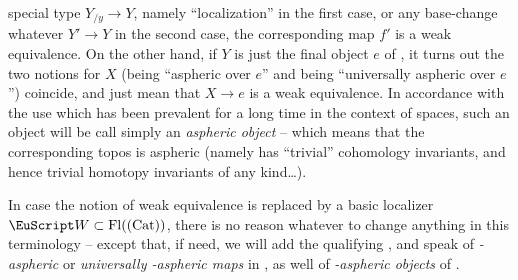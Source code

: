special type $Y_{/y}\to Y$, namely ``localization'' in the first case,
or any base-change whatever $Y'\to Y$ in the second case, the
corresponding map $f'$ is a weak equivalence. On the other hand, if
$Y$ is just the final object $e$ of \Cat, it turns out the two notions for
$X$ (being ``aspheric over $e$'' and being ``universally aspheric over
$e$'') coincide, and just mean that $X\to e$ is a weak equivalence. In
accordance with the use which has been prevalent for a long time in
the context of spaces, such an object will be call simply an
\emph{aspheric object} -- which means that the corresponding topos is
aspheric (namely has ``trivial'' cohomology invariants, and hence
trivial homotopy invariants of any kind\ldots).

In case the notion of weak equivalence is replaced by a basic
localizer $\scrW\subset\Fl(\Cat)$, there is no reason whatever to
change anything in this terminology -- except that, if need, we will
add the qualifying \scrW, and speak of \emph{\scrW-aspheric} or
\emph{universally \scrW-aspheric maps} in \Cat, as well of
\emph{\scrW-aspheric objects} of \Cat.

